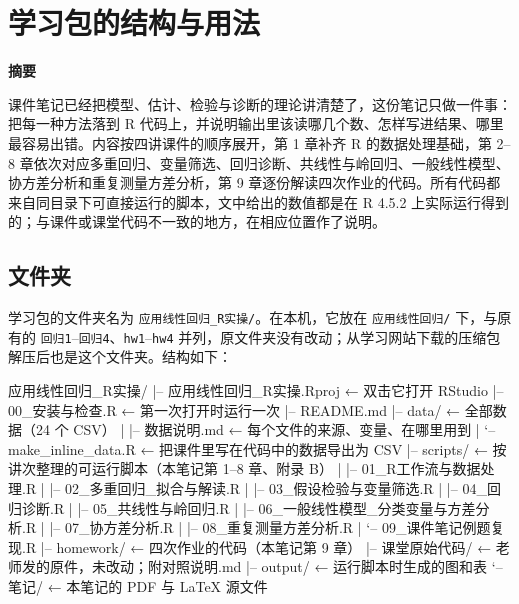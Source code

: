 \chapter{学习包的结构与用法}

\begin{studyreview}
\textbf{摘要}


课件笔记已经把模型、估计、检验与诊断的理论讲清楚了，这份笔记只做一件事：把每一种方法落到 R 代码上，并说明输出里该读哪几个数、怎样写进结果、哪里最容易出错。内容按四讲课件的顺序展开，第 1 章补齐 R 的数据处理基础，第 2–8 章依次对应多重回归、变量筛选、回归诊断、共线性与岭回归、一般线性模型、协方差分析和重复测量方差分析，第 9 章逐份解读四次作业的代码。所有代码都来自同目录下可直接运行的脚本，文中给出的数值都是在 R 4.5.2 上实际运行得到的；与课件或课堂代码不一致的地方，在相应位置作了说明。

\end{studyreview}


\section{文件夹}
学习包的文件夹名为 \Verb|应用线性回归_R实操/|。在本机，它放在 \Verb|应用线性回归/| 下，与原有的 \Verb|回归1|–\Verb|回归4|、\Verb|hw1|–\Verb|hw4| 并列，原文件夹没有改动；从学习网站下载的压缩包解压后也是这个文件夹。结构如下：

\begin{routput}[目录结构]
应用线性回归_R实操/
|-- 应用线性回归_R实操.Rproj   ← 双击它打开 RStudio
|-- 00_安装与检查.R            ← 第一次打开时运行一次
|-- README.md
|-- data/                      ← 全部数据（24 个 CSV）
|   |-- 数据说明.md            ← 每个文件的来源、变量、在哪里用到
|   `-- make_inline_data.R     ← 把课件里写在代码中的数据导出为 CSV
|-- scripts/                   ← 按讲次整理的可运行脚本（本笔记第 1–8 章、附录 B）
|   |-- 01_R工作流与数据处理.R
|   |-- 02_多重回归_拟合与解读.R
|   |-- 03_假设检验与变量筛选.R
|   |-- 04_回归诊断.R
|   |-- 05_共线性与岭回归.R
|   |-- 06_一般线性模型_分类变量与方差分析.R
|   |-- 07_协方差分析.R
|   |-- 08_重复测量方差分析.R
|   `-- 09_课件笔记例题复现.R
|-- homework/                  ← 四次作业的代码（本笔记第 9 章）
|-- 课堂原始代码/               ← 老师发的原件，未改动；附对照说明.md
|-- output/                    ← 运行脚本时生成的图和表
`-- 笔记/                      ← 本笔记的 PDF 与 LaTeX 源文件
\end{routput}

